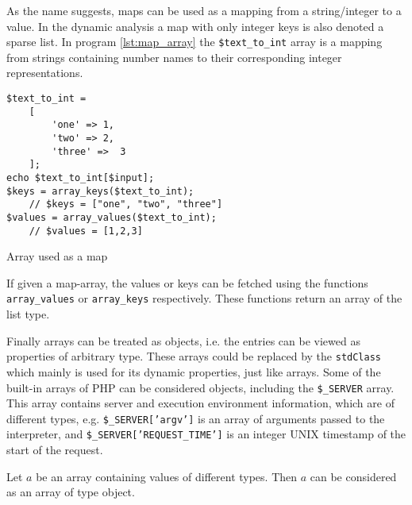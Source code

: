 As the name suggests, maps can be used as a mapping from a string/integer to a value. In the dynamic analysis a map with only integer keys is also denoted a sparse list. In program \ref{lst:map_array} the \texttt{\$text\_to\_int} array is a mapping from strings containing number names to their corresponding integer representations. 

\begin{program}[ht]
\begin{lstlisting}
$text_to_int = 
    [ 
        'one' => 1,
        'two' => 2,
        'three' =>  3
    ];
echo $text_to_int[$input]; 
$keys = array_keys($text_to_int);
    // $keys = ["one", "two", "three"]
$values = array_values($text_to_int);
    // $values = [1,2,3]
\end{lstlisting}
\caption{Array used as a map}
\label{lst:map_array}
\end{program}

If given a map-array, the values or keys can be fetched using the functions \texttt{array\_values} or \texttt{array\_keys} respectively. These functions return an array of the list type. 

Finally arrays can be treated as objects, i.e. the entries can be viewed as properties of arbitrary type. These arrays could be replaced by the \texttt{stdClass} which mainly is used for its dynamic properties, just like arrays. Some of the built-in arrays of PHP can be considered objects, including the \texttt{\$\_SERVER} array. This array contains server and execution environment information, which are of different types, e.g. \texttt{\$\_SERVER['argv']} is an array of arguments passed to the interpreter, and \texttt{\$\_SERVER['REQUEST\_TIME']} is an integer UNIX timestamp of the start of the request. 

\begin{definition}
\label{def:object}
Let $a$ be an array containing values of different types. Then $a$ can be considered as an array of type object.
\end{definition}


